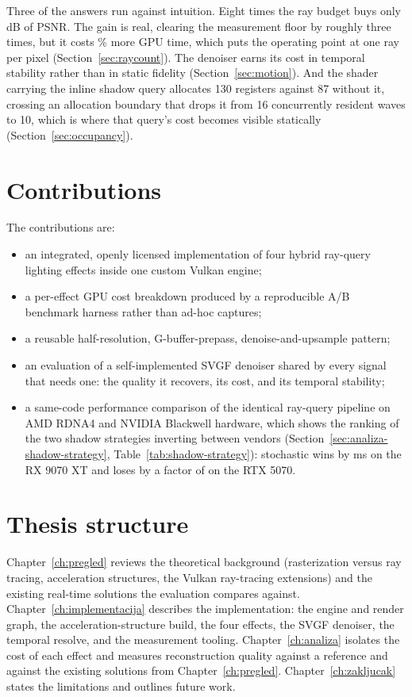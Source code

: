 Three of the answers run against intuition. Eight times the ray budget buys only \rcPsnrGain{} dB of
PSNR. The gain is real, clearing the measurement floor by roughly three times, but it costs
\rcGpuPct\% more GPU time, which puts the operating point at one ray per pixel
(Section~\ref{sec:raycount}). The denoiser earns its cost in temporal stability rather than in static
fidelity (Section~\ref{sec:motion}). And the shader carrying the inline shadow query allocates 130
registers against 87 without it, crossing an allocation boundary that drops it from 16 concurrently
resident waves to 10, which is where that query's cost becomes visible statically
(Section~\ref{sec:occupancy}).

\section{Contributions}

The contributions are:

\begin{itemize}
\item an integrated, openly licensed implementation of four hybrid ray-query lighting effects inside
one custom Vulkan engine;
\item a per-effect GPU cost breakdown produced by a reproducible A/B benchmark harness rather than
ad-hoc captures;
\item a reusable half-resolution, G-buffer-prepass, denoise-and-upsample pattern;
\item an evaluation of a self-implemented SVGF denoiser shared by every signal that needs one: the
quality it recovers, its cost, and its temporal stability;
\item a same-code performance comparison of the identical ray-query pipeline on AMD RDNA4 and NVIDIA
Blackwell hardware, which shows the ranking of the two shadow strategies inverting between vendors
(Section~\ref{sec:analiza-shadow-strategy}, Table~\ref{tab:shadow-strategy}): stochastic wins by
\perfShadowGapAMD{} ms on the RX 9070 XT and loses by a factor of \perfShadowRatioNV{} on the
RTX 5070.
\end{itemize}

\section{Thesis structure}

Chapter~\ref{ch:pregled} reviews the theoretical background (rasterization versus ray tracing,
acceleration structures, the Vulkan ray-tracing extensions) and the existing real-time solutions the
evaluation compares against. Chapter~\ref{ch:implementacija} describes the implementation: the engine
and render graph, the acceleration-structure build, the four effects, the SVGF denoiser, the temporal
resolve, and the measurement tooling. Chapter~\ref{ch:analiza} isolates the cost of each effect and
measures reconstruction quality against a reference and against the existing solutions from
Chapter~\ref{ch:pregled}. Chapter~\ref{ch:zakljucak} states the limitations and outlines future work.
